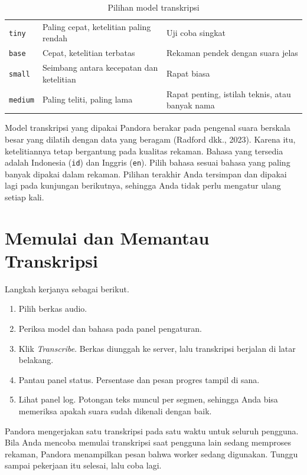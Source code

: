 \begin{table}[H]
\caption{Pilihan model transkripsi}
\label{tab:model}
{\small
\begin{tabularx}{\linewidth}{@{}K{2.4cm}YP{4.2cm}@{}}
\toprule
{} &  &  \\
\midrule
\texttt{tiny} & Paling cepat, ketelitian paling rendah & Uji coba singkat \\
\texttt{base} & Cepat, ketelitian terbatas & Rekaman pendek dengan suara jelas \\
\texttt{small} & Seimbang antara kecepatan dan ketelitian & Rapat biasa \\
\texttt{medium} & Paling teliti, paling lama & Rapat penting, istilah teknis, atau banyak nama \\
\bottomrule
\end{tabularx}
}
\end{table}

Model transkripsi yang dipakai Pandora berakar pada pengenal suara berskala besar yang dilatih dengan data yang beragam (Radford dkk., 2023). Karena itu, ketelitiannya tetap bergantung pada kualitas rekaman. Bahasa yang tersedia adalah Indonesia (\texttt{id}) dan Inggris (\texttt{en}). Pilih bahasa sesuai bahasa yang paling banyak dipakai dalam rekaman. Pilihan terakhir Anda tersimpan dan dipakai lagi pada kunjungan berikutnya, sehingga Anda tidak perlu mengatur ulang setiap kali.

\section{Memulai dan Memantau Transkripsi}
Langkah kerjanya sebagai berikut.
\begin{enumerate}
  \item Pilih berkas audio.
  \item Periksa model dan bahasa pada panel pengaturan.
  \item Klik \emph{Transcribe}. Berkas diunggah ke server, lalu transkripsi berjalan di latar belakang.
  \item Pantau panel status. Persentase dan pesan progres tampil di sana.
  \item Lihat panel log. Potongan teks muncul per segmen, sehingga Anda bisa memeriksa apakah suara sudah dikenali dengan baik.
\end{enumerate}

Pandora mengerjakan satu transkripsi pada satu waktu untuk seluruh pengguna. Bila Anda mencoba memulai transkripsi saat pengguna lain sedang memproses rekaman, Pandora menampilkan pesan bahwa worker sedang digunakan. Tunggu sampai pekerjaan itu selesai, lalu coba lagi.

